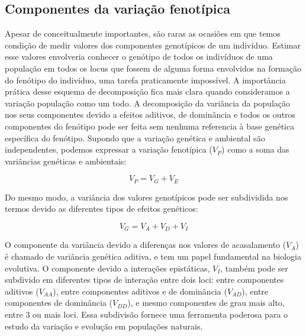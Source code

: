 \begin{refsection}
\subsection{Componentes da variação fenotípica}

Apesar de conceitualmente importantes, são raras as ocasiões em que temos
condição de medir valores dos componentes genotípicos de um indivíduo. Estimar
esse valores envolveria conhecer o genótipo de todos os indivíduos de uma
população em todos os locus que fossem de alguma forma envolvidos na formação
do fenótipo do indivíduo, uma tarefa praticamente impossível. A importância
prática desse esquema de decomposição fica mais clara quando consideramos a
variação população como um todo. A decomposição da variância da população nos
seus componentes devido a efeitos aditivos, de dominância e todos os outros
componentes do fenótipo pode ser feita sem nenhuma referencia à base genética
específica do fenótipo. Supondo que a variação genética e ambiental são
independentes, podemos expressar a variação fenotípica ($V_P$) como a soma das
variâncias genéticas e ambientais:

\begin{equation}
V_P = V_G + V_E
\end{equation}

Do mesmo modo, a variância dos valores genotípicos pode ser subdividida nos termos devido as diferentes tipos de efeitos genéticos:

\begin{equation}
V_G = V_A + V_D + V_I
\end{equation}

O componente da variância devido a diferenças nos valores de acasalamento
($V_A$) é chamado de variância genética aditiva, e tem um papel fundamental na
biologia evolutiva. O componente devido a interações epistáticas, $V_I$,
também pode ser subdivido em diferentes tipos de interação entre dois loci:
entre componentes aditivos ($V_{AA}$), entre componentes aditivos e de
dominância ($V_{AD}$), entre componentes de dominância ($V_{DD}$), e mesmo
componentes de grau mais alto, entre 3 ou mais loci. Essa subdivisão fornece
uma ferramenta poderosa para o estudo da variação e evolução em populações
naturais.


\end{refsection}
